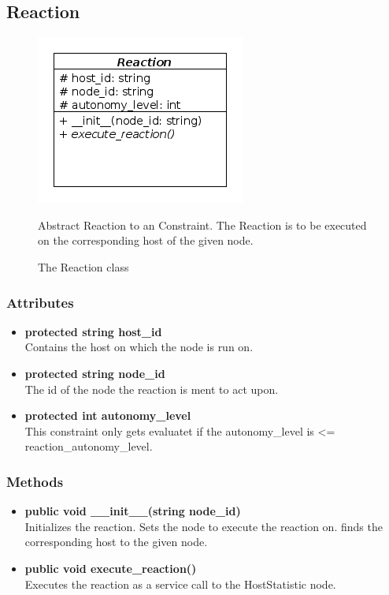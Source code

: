 \subsection{Reaction}
\begin{figure}[htbp]
	\begin{minipage}[t]{8cm}
		\vspace{0pt}
		\centering
		\includegraphics[scale=0.6]{./diagram_pictures/reactor/Reaction.png}
		\caption{The Reaction class}
	\end{minipage}
	\hfill
	\begin{minipage}[t]{8cm}
		\vspace{10pt}
			Abstract Reaction to an Constraint. The Reaction is to be executed on the corresponding host of the given node.
	\end{minipage}
\end{figure}  

\subsubsection{Attributes}
\begin{itemize}
	\item \textbf{ protected string host\_id }\\
		Contains the host on which the node is run on.
	\item \textbf{ protected string node\_id }\\
		The id of the node the reaction is ment to act upon.
	\item \textbf{ protected int autonomy\_level }\\
		This constraint only gets evaluatet if 
		the autonomy\_level is <= reaction\_autonomy\_level.
\end{itemize}
\subsubsection{Methods}
\begin{itemize}
	\item \textbf{ public void \_\_init\_\_(string node\_id) }\\
		Initializes the reaction. Sets the node to execute the reaction on. finds the corresponding host to the given node.
	\item \textbf{ public void execute\_reaction() }\\
		Executes the reaction as a service call to the HostStatistic node.
\end{itemize}

